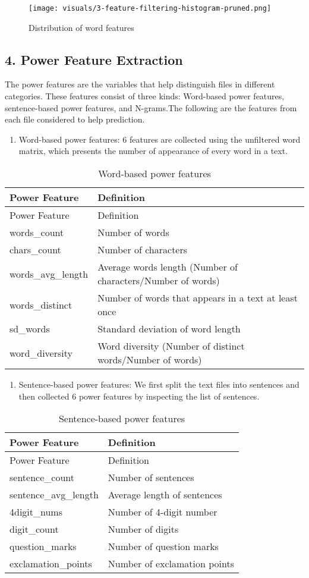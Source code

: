 \documentclass[12pt,]{article}
\begin{document}
\begin{figure}[htbp]
\centering
\texttt{[image: visuals/3-feature-filtering-histogram-pruned.png]}
\caption{Distribution of word features}
\end{figure}

\subsection{4. Power Feature Extraction}\label{power-feature-extraction}

The power features are the variables that help distinguish files in
different categories. These features consist of three kinds: Word-based
power features, sentence-based power features, and N-grams.The following
are the features from each file considered to help prediction.

\begin{enumerate}
\def\labelenumi{(\arabic{enumi})}
\itemsep1pt\parskip0pt
\item
  Word-based power features: 6 features are collected using the
  unfiltered word matrix, which presents the number of appearance of
  every word in a text.
\end{enumerate}

\begin{longtable}[c]{@{}ll@{}}
\caption{Word-based power features}\tabularnewline
\toprule
Power Feature & Definition\tabularnewline
\midrule
\endfirsthead
\toprule
Power Feature & Definition\tabularnewline
\midrule
\endhead
words\_count & Number of words\tabularnewline
chars\_count & Number of characters\tabularnewline
words\_avg\_length & Average words length (Number of characters/Number
of words)\tabularnewline
words\_distinct & Number of words that appears in a text at least
once\tabularnewline
sd\_words & Standard deviation of word length\tabularnewline
word\_diversity & Word diversity (Number of distinct words/Number of
words)\tabularnewline
\bottomrule
\end{longtable}

\begin{enumerate}
\def\labelenumi{(\arabic{enumi})}
\setcounter{enumi}{1}
\itemsep1pt\parskip0pt
\item
  Sentence-based power features: We first split the text files into
  sentences and then collected 6 power features by inspecting the list
  of sentences.
\end{enumerate}

\begin{longtable}[c]{@{}ll@{}}
\caption{Sentence-based power features}\tabularnewline
\toprule
Power Feature & Definition\tabularnewline
\midrule
\endfirsthead
\toprule
Power Feature & Definition\tabularnewline
\midrule
\endhead
sentence\_count & Number of sentences\tabularnewline
sentence\_avg\_length & Average length of sentences\tabularnewline
4digit\_nums & Number of 4-digit number\tabularnewline
digit\_count & Number of digits\tabularnewline
question\_marks & Number of question marks\tabularnewline
exclamation\_points & Number of exclamation points\tabularnewline
\bottomrule
\end{longtable}
\end{document}
